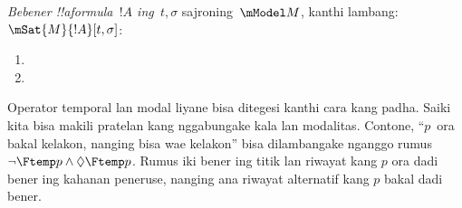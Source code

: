 \documentclass[../../../include/open-logic-section]{subfiles}
\begin{document}
\begin{defn}
  \emph{Bebener !!a{formula}~$!A$ ing~$t, \sigma$} sajroning~$\mModel M$, kanthi lambang:
  $\mSat{M}{!A}[t, \sigma]$:
  \begin{enumerate}
  \item{} 
  \item{} 
  \end{enumerate} 
\end{defn}

Operator temporal lan modal liyane bisa ditegesi kanthi cara kang
padha. Saiki kita bisa makili pratelan kang nggabungake kala lan
modalitas. Contone, ``$p$~ora bakal kelakon, nanging bisa wae
kelakon'' bisa dilambangake nganggo rumus
$\lnot \Ftemp p \land \Diamond \Ftemp p$. Rumus iki bener ing
titik lan riwayat kang $p$ ora dadi bener ing kahanan peneruse,
nanging ana riwayat alternatif kang $p$ bakal dadi bener.
\end{document}
